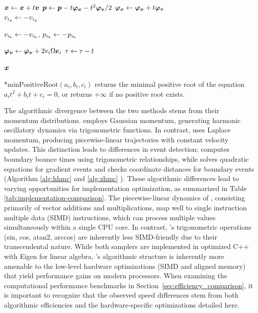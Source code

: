 \begin{minipage}[t]{0.49\textwidth}
\begin{algorithm}[H]
\begin{algorithmic}[1]
				\STATE $ \bm{x} \gets \bm{x} +  t \bm{v}$ 
				\STATE $ \bm{p} \gets \bm{p} - t \bm{\varphi}_{\bm{x}} - t^2 \bm{\varphi}_{\bm{v}} / 2$ 
				\STATE $ \bm{\varphi}_{\bm{x}} \gets \bm{\varphi}_{\bm{x}} + t \bm{\varphi}_{\bm{v}} $ \\
				\spacersmall
				\STATE $v_{i_g} \gets -v_{i_g}$  

				\STATE $v_{i_\textrm{b}} \gets -v_{i_\textrm{b}}$, $p_{i_\textrm{b}} \gets -p_{i_\textrm{b}}$ 
				\ENDIF
				\spacersmall

				\STATE $ \bm{\varphi}_{\bm{v}} \gets \bm{\varphi}_{\bm{v}} + 2v_i \Omega \bm{e}_i $
				\STATE $ \tau \gets \tau - t $

				\ENDWHILE
				\RETURN $ \bm{x} $
			\end{algorithmic}
			*$\text{minPositiveRoot}(a_i, b_i, c_i) $ returns the minimal positive root of the equation $ a_i t^2 + b_i t + c_i = 0 $, or returns $+\infty$ if no positive root exists.
		\end{algorithm}
	\end{minipage}

The algorithmic divergence between the two methods stems from their momentum distributions. \hhmc employs Gaussian momentum, generating harmonic oscillatory dynamics via trigonometric functions. In contrast, \zhmc uses Laplace momentum, producing piecewise-linear trajectories with constant velocity updates. This distinction leads to differences in event detection: \hhmc computes boundary bounce times using trigonometric relationships, while \zhmc solves quadratic equations for gradient events and checks coordinate distances for boundary events (Algorithm \ref{alg:hhmc} and \ref{alg:zhmc} ). These algorithmic differences lead to varying opportunities for implementation optimization, as summarized in Table \ref{tab:implementation-comparison}. The piecewise-linear dynamics of \zhmc, consisting primarily of vector additions and multiplications, map well to single instruction multiple data (SIMD) instructions, which can process multiple values simultaneously within a single CPU core. In contrast, \hhmc's trigonometric operations (sin, cos, atan2, arccos) are inherently less SIMD-friendly due to their transcendental nature. While both samplers are implemented in optimized C++ with Eigen for linear algebra, \zhmc's algorithmic structure is inherently more amenable to the low-level hardware optimizations (SIMD and aligned memory) that yield performance gains on modern processors. When examining the computational performance benchmarks in Section~\ref{sec:efficiency_comparison}, it is important to recognize that the observed speed differences stem from both algorithmic efficiencies and the hardware-specific optimizations detailed here.

